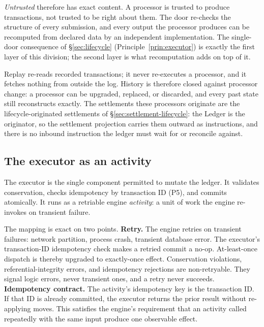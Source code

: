 \emph{Untrusted} therefore has exact content. A processor is trusted to produce transactions, not trusted to be right about them. The door re-checks the structure of every submission, and every output the processor produces can be recomputed from declared data by an independent implementation. The single-door consequence of \S\ref{sec:lifecycle} (Principle~\ref{prin:executor}) is exactly the first layer of this division; the second layer is what recomputation adds on top of it.

Replay re-reads recorded transactions; it never re-executes a processor, and it fetches nothing from outside the log. History is therefore closed against processor change: a processor can be upgraded, replaced, or discarded, and every past state still reconstructs exactly. The settlements these processors originate are the lifecycle-originated settlements of \S\ref{sec:settlement-lifecycle}: the Ledger is the originator, so the settlement projection carries them outward as instructions, and there is no inbound instruction the ledger must wait for or reconcile against.

\subsection{The executor as an activity}
\label{sec:executor-activity}

The executor is the single component permitted to mutate the ledger. It validates conservation, checks idempotency by transaction ID (P5), and commits atomically. It runs as a retriable engine \emph{activity}: a unit of work the engine re-invokes on transient failure.

The mapping is exact on two points. \textbf{Retry.} The engine retries on transient failures: network partition, process crash, transient database error. The executor's transaction-ID idempotency check makes a retried commit a no-op. At-least-once dispatch is thereby upgraded to exactly-once effect. Conservation violations, referential-integrity errors, and idempotency rejections are non-retryable. They signal logic errors, never transient ones, and a retry never succeeds. \textbf{Idempotency contract.} The activity's idempotency key is the transaction ID. If that ID is already committed, the executor returns the prior result without re-applying moves. This satisfies the engine's requirement that an activity called repeatedly with the same input produce one observable effect.

